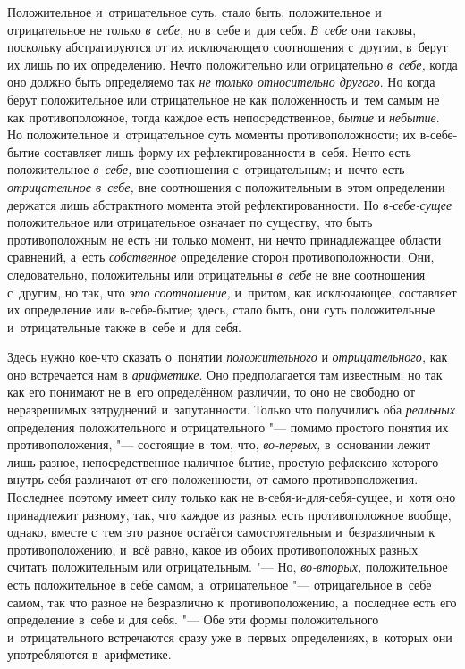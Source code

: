Положительное и~отрицательное суть, стало быть, положительное и
отрицательное не только {\em в~себе,} но в~себе и~для
себя. {\em В~себе} они таковы, поскольку абстрагируются
от их исключающего соотношения с~другим, в~берут их лишь по их определению.
Нечто положительно или отрицательно {\em в~себе,} когда
оно должно быть определяемо так {\em не только
относительно другого}. Но когда берут положительное или отрицательное не
как положенность и~тем самым не как противоположное, тогда каждое есть
непосредственное, {\em бытие} и
{\em небытие}. Но положительное и~отрицательное суть
моменты противоположности; их в-себе-бытие составляет лишь форму их
рефлектированности в~себя. Нечто есть положительное
{\em в~себе,} вне соотношения с~отрицательным; и~нечто
есть {\em отрицательное в~себе,} вне соотношения с
положительным
в~этом определении держатся лишь абстрактного момента этой
рефлектированности. Но {\em в-себе-сущее} положительное
или отрицательное означает по существу, что быть противоположным не есть ни
только момент, ни нечто принадлежащее области сравнений, а~есть
{\em собственное} определение сторон противоположности.
Они, следовательно, положительны или отрицательны
{\em в~себе} не вне соотношения с~другим, но так, что
{\em это соотношение,} и~притом, как исключающее,
составляет их определение или в-себе-бытие; здесь, стало быть, они суть
положительные и~отрицательные также в~себе и~для себя.


Здесь нужно кое-что сказать о~понятии {\em положительного} и
{\em отрицательного,} как оно встречается нам в
{\em арифметике}. Оно предполагается там известным; но
так как его понимают не в~его определённом различии, то оно не свободно от
неразрешимых затруднений и~запутанности. Только что получились оба
{\em реальных} определения положительного и
отрицательного "--- помимо простого понятия их противоположения,
"--- состоящие в~том, что, {\em во-первых,} в~основании лежит лишь
разное, непосредственное наличное бытие, простую рефлексию которого внутрь
себя различают от его положенности, от самого противоположения. Последнее
поэтому имеет силу только как не в-себя-и-для-себя-сущее, и~хотя оно
принадлежит разному, так, что каждое из разных есть противоположное вообще,
однако, вместе с~тем это разное остаётся самостоятельным и~безразличным к
противоположению, и~всё равно, какое из обоих противоположных разных
считать положительным или отрицательным. "--- Но,
{\em во-вторых,} положительное есть положительное в
себе самом, а~отрицательное "--- отрицательное в~себе самом, так что разное не
безразлично к~противоположению, а~последнее есть его определение в~себе и
для себя. "--- Обе эти формы положительного и~отрицательного встречаются сразу
уже в~первых определениях, в~которых они употребляются в~арифметике.

